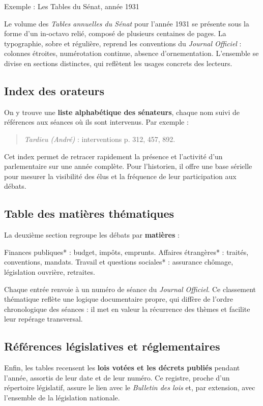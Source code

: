 Exemple : Les Tables du Sénat, année 1931

Le volume des \emph{Tables annuelles du Sénat} pour l’année 1931 se présente sous la forme d’un in-octavo relié, composé de plusieurs centaines de pages. La typographie, sobre et régulière, reprend les conventions du \emph{Journal Officiel} : colonnes étroites, numérotation continue, absence d’ornementation. L’ensemble se divise en sections distinctes, qui reflètent les usages concrets des lecteurs.

\subsection{Index des orateurs}

On y trouve une \textbf{liste alphabétique des sénateurs}, chaque nom suivi de références aux séances où ils sont intervenus. Par exemple :

\begin{quote}
\emph{Tardieu (André)} : interventions p. 312, 457, 892.

\end{quote}
Cet index permet de retracer rapidement la présence et l’activité d’un parlementaire sur une année complète. Pour l’historien, il offre une base sérielle pour mesurer la visibilité des élus et la fréquence de leur participation aux débats.

\subsection{Table des matières thématiques}

La deuxième section regroupe les débats par \textbf{matières} :

\emph{ }Finances publiques* : budget, impôts, emprunts.
\emph{ }Affaires étrangères* : traités, conventions, mandats.
\emph{ }Travail et questions sociales* : assurance chômage, législation ouvrière, retraites.

Chaque entrée renvoie à un numéro de séance du \emph{Journal Officiel}. Ce classement thématique reflète une logique documentaire propre, qui diffère de l’ordre chronologique des séances : il met en valeur la récurrence des thèmes et facilite leur repérage transversal.

\subsection{Références législatives et réglementaires}

Enfin, les tables recensent les \textbf{lois votées et les décrets publiés} pendant l’année, assortis de leur date et de leur numéro. Ce registre, proche d’un répertoire législatif, assure le lien avec le \emph{Bulletin des lois} et, par extension, avec l’ensemble de la législation nationale.

